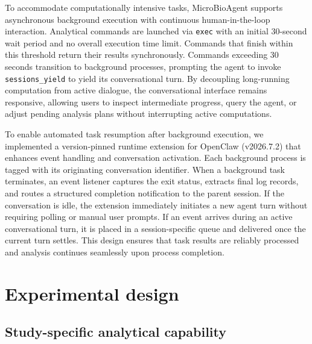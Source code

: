 \documentclass[10pt,letterpaper]{article}
\begin{document}
To accommodate computationally intensive tasks, MicroBioAgent supports
asynchronous background execution with continuous human-in-the-loop
interaction. Analytical commands are launched via \texttt{exec} with an initial
30-second wait period and no overall execution time limit. Commands that finish
within this threshold return their results synchronously. Commands exceeding 30
seconds transition to background processes, prompting the agent to invoke
\texttt{sessions\_yield} to yield its conversational turn. By decoupling
long-running computation from active dialogue, the conversational interface
remains responsive, allowing users to inspect intermediate progress, query the
agent, or adjust pending analysis plans without interrupting active
computations.

To enable automated task resumption after background execution, we implemented
a version-pinned runtime extension for OpenClaw (v2026.7.2) that enhances event
handling and conversation activation. Each background process is tagged with
its originating conversation identifier. When a background task terminates, an
event listener captures the exit status, extracts final log records, and routes
a structured completion notification to the parent session. If the conversation
is idle, the extension immediately initiates a new agent turn without requiring
polling or manual user prompts. If an event arrives during an active
conversational turn, it is placed in a session-specific queue and delivered
once the current turn settles. This design ensures that task results are
reliably processed and analysis continues seamlessly upon process completion.

\section{Experimental design}

\subsection{Study-specific analytical capability}
\end{document}
